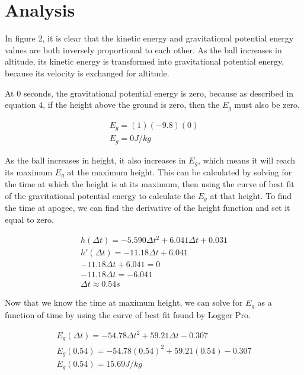 \documentclass[10pt,twocolumn,letterpaper]{article}
\begin{document}
\section{Analysis}

In figure 2, it is clear that the kinetic energy and gravitational potential energy values are both inversely proportional to each other. As the ball increases in altitude, its kinetic energy is transformed into gravitational potential energy, because its velocity is exchanged for altitude. 

At 0 seconds, the gravitational potential energy is zero, because as described in equation 4, if the height above the ground is zero, then the \(E_{g}\) must also be zero. 

\begin{align}
    \nonumber E_{g} = (1)(-9.8)(0) \\
    \nonumber E_{g} = 0 J/kg
\end{align}

As the ball increases in height, it also increases in \(E_{g}\), which means it will reach its maximum \(E_{g}\) at the maximum height. This can be calculated by solving for the time at which the height is at its maximum, then using the curve of best fit of the gravitational potential energy to calculate the \(E_{g}\) at that height. To find the time at apogee, we can find the derivative of the height function and set it equal to zero.

\begin{align}
    \nonumber h(\Delta t) = -5.590\Delta t^2+6.041\Delta t+0.031 \\
    \nonumber h'(\Delta t) = -11.18\Delta t+6.041 \\
    \nonumber -11.18\Delta t+6.041 = 0\\
    \nonumber -11.18\Delta t = -6.041\\
    \nonumber \Delta t \approx 0.54s
\end{align}

Now that we know the time at maximum height, we can solve for \(E_{g}\) as a function of time by using the curve of best fit found by Logger Pro.

\begin{align}
    \nonumber E_{g}(\Delta t) = -54.78\Delta t^2+59.21\Delta t-0.307 \\
    \nonumber E_{g}(0.54) = -54.78(0.54)^2+59.21(0.54)-0.307 \\
    \nonumber E_{g}(0.54) = 15.69 J/kg
\end{align}
\end{document}
